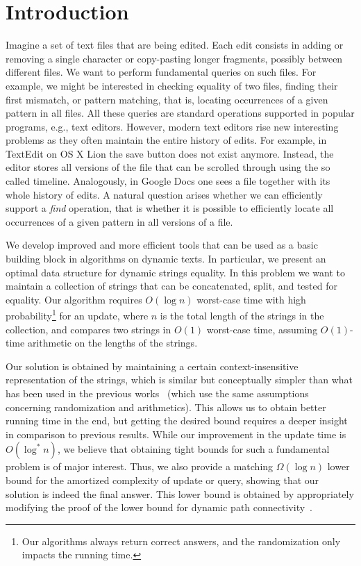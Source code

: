 \documentclass[a4paper]{article}
\theoremstyle{remark}
\begin{document}
\tableofcontents
\newpage

\section{Introduction}
Imagine a set of text files that are being edited. Each edit consists in adding or removing a single character or copy-pasting longer
fragments, possibly between different files. We want to perform fundamental queries on such
files. For example, we might be interested in checking equality of two files, finding their
first mismatch, or pattern matching, that is, locating occurrences of a given pattern in all files.
All these queries are standard operations supported in popular programs, e.g., text editors. However, modern
text editors rise new interesting problems as they often maintain the entire history of edits.
For example, in TextEdit on OS X Lion the save button does not exist anymore.
Instead, the editor stores all versions of the file that can be scrolled through using the so called timeline.
Analogously, in Google Docs one sees a file together with its whole history of edits.
A natural question arises whether we can efficiently support a \emph{find} operation,
that is whether it is possible to efficiently locate all occurrences of a given pattern in all versions of a file.

We develop improved and more efficient tools that can be used as a basic building block in algorithms on dynamic texts.
In particular, we present an optimal data structure for dynamic strings equality.
In this problem we want to maintain a collection of strings that can be concatenated, split, and tested for equality. Our algorithm
requires $O(\log n)$ worst-case time with high probability\footnote{Our algorithms always return correct answers, and the
randomization only impacts the running time.} for an update, where $n$ is the total length of the strings in the collection,
and compares two strings in $O(1)$ worst-case time, assuming $O(1)$-time arithmetic on
the lengths of the strings.

Our solution is obtained by maintaining a certain context-insensitive representation of the strings,
which is similar but conceptually simpler than what has been used in the previous works~\cite{Alstrup,Mehlhorn}
(which use the same assumptions concerning randomization and arithmetics).
This allows us to obtain better running time in the end, but getting the desired bound requires a deeper insight in comparison to previous results.
While our improvement in the update time is $O(\log^*n)$, we
believe that obtaining tight bounds for such a fundamental problem is of major interest.
Thus, we also provide a matching $\Omega(\log n)$ lower bound for the amortized complexity
of update or query, showing that our solution is indeed the final answer. This lower bound is obtained
by appropriately modifying the proof of the lower bound for dynamic path connectivity~\cite{logarithmic}.
\end{document}
